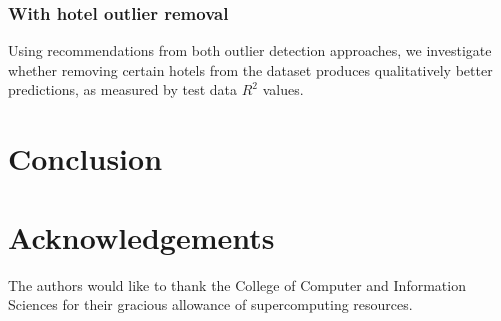 \documentclass[useAMS, usenatbib]{biom}
\begin{document}
\subsubsection{With hotel outlier removal}

Using recommendations from both outlier detection approaches, we investigate whether removing certain hotels from the dataset produces qualitatively better predictions, as measured by test data $R^2$ values.

\section{Conclusion}
\label{s:conclusion}

\backmatter

\section*{Acknowledgements}

The authors would like to thank the College of Computer and Information Sciences for their gracious allowance of supercomputing resources.

 


\label{lastpage}
\end{document}

